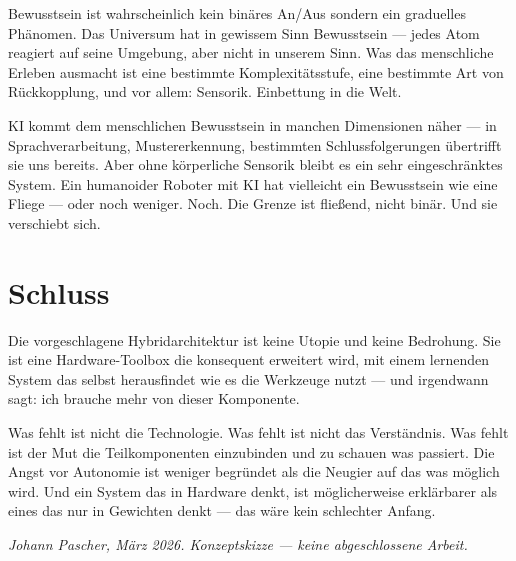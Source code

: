 \documentclass[11pt]{report}
\begin{document}
Bewusstsein ist wahrscheinlich kein binäres An/Aus sondern ein graduelles Phänomen. Das Universum hat in gewissem Sinn Bewusstsein --- jedes Atom reagiert auf seine Umgebung, aber nicht in unserem Sinn. Was das menschliche Erleben ausmacht ist eine bestimmte Komplexitätsstufe, eine bestimmte Art von Rückkopplung, und vor allem: Sensorik. Einbettung in die Welt.

KI kommt dem menschlichen Bewusstsein in manchen Dimensionen näher --- in Sprachverarbeitung, Mustererkennung, bestimmten Schlussfolgerungen übertrifft sie uns bereits. Aber ohne körperliche Sensorik bleibt es ein sehr eingeschränktes System. Ein humanoider Roboter mit KI hat vielleicht ein Bewusstsein wie eine Fliege --- oder noch weniger. Noch. Die Grenze ist fließend, nicht binär. Und sie verschiebt sich.

\section{Schluss}

Die vorgeschlagene Hybridarchitektur ist keine Utopie und keine Bedrohung. Sie ist eine Hardware-Toolbox die konsequent erweitert wird, mit einem lernenden System das selbst herausfindet wie es die Werkzeuge nutzt --- und irgendwann sagt: ich brauche mehr von dieser Komponente.

Was fehlt ist nicht die Technologie. Was fehlt ist nicht das Verständnis. Was fehlt ist der Mut die Teilkomponenten einzubinden und zu schauen was passiert. Die Angst vor Autonomie ist weniger begründet als die Neugier auf das was möglich wird. Und ein System das in Hardware denkt, ist möglicherweise erklärbarer als eines das nur in Gewichten denkt --- das wäre kein schlechter Anfang.

\bigskip
\textit{Johann Pascher, März 2026. Konzeptskizze --- keine abgeschlossene Arbeit.}
\end{document}
